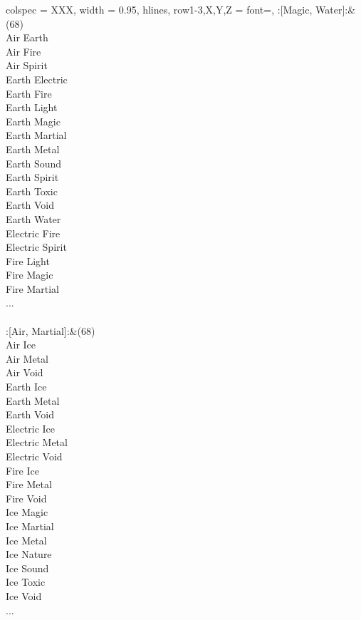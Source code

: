 \begin{longtblr}[
	caption = {2v2 Defending Weak},
	label = {2v2-Defending-Weak},
]{
	colspec = {XXX}, width = 0.95\linewidth,
	hlines,
	row{1-3,X,Y,Z} = {font=\bfseries},
}
	:[Magic, Water]:&{(68)\\
	Air Earth \\
	Air Fire \\
	Air Spirit \\
	Earth Electric \\
	Earth Fire \\
	Earth Light \\
	Earth Magic \\
	Earth Martial \\
	Earth Metal \\
	Earth Sound \\
	Earth Spirit \\
	Earth Toxic \\
	Earth Void \\
	Earth Water \\
	Electric Fire \\
	Electric Spirit \\
	Fire Light \\
	Fire Magic \\
	Fire Martial \\
	...\\
	}\\

	:[Air, Martial]:&{(68)\\
	Air Ice \\
	Air Metal \\
	Air Void \\
	Earth Ice \\
	Earth Metal \\
	Earth Void \\
	Electric Ice \\
	Electric Metal \\
	Electric Void \\
	Fire Ice \\
	Fire Metal \\
	Fire Void \\
	Ice Magic \\
	Ice Martial \\
	Ice Metal \\
	Ice Nature \\
	Ice Sound \\
	Ice Toxic \\
	Ice Void \\
	...\\
	}\\


\end{longtblr}
